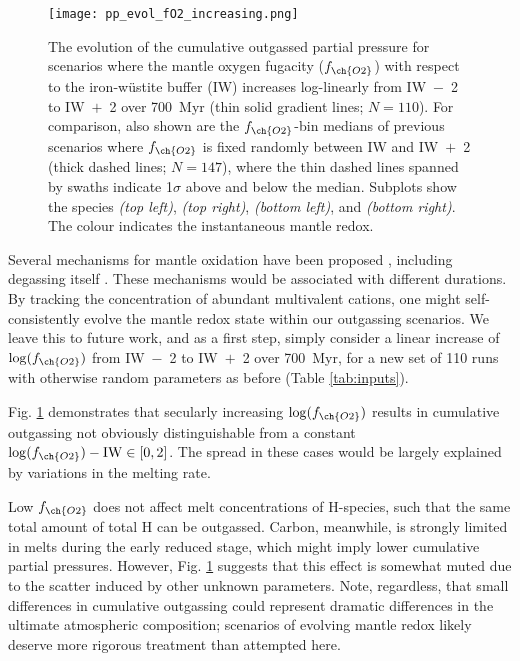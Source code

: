 \begin{figure}
\centering\texttt{[image: pp\_evol\_fO2\_increasing.png]}
\caption[The evolution of cumulative outgassed partial pressures for scenarios where Archean Earth's mantle oxygen fugacity increases steadily over time.]{The evolution of the cumulative outgassed partial pressure for scenarios where the mantle oxygen fugacity ($f_{\ch{O2}}$) with respect to the iron-w\"ustite buffer (IW) increases log-linearly from IW~$-$~2 to IW~$+$~2 over 700~Myr (thin solid gradient lines; $N=110$). For comparison, also shown are the $f_{\ch{O2}}$-bin medians of previous scenarios where $f_{\ch{O2}}$ is fixed randomly between IW and IW~$+$~2 (thick dashed lines; $N=147$), where the thin dashed lines spanned by swaths indicate 1$\sigma$ above and below the median. Subplots show the species  \textit{(top left)},  \textit{(top right)},  \textit{(bottom left)}, and  \textit{(bottom right)}. The colour indicates the instantaneous mantle redox. \label{fig:evol_fo2increase}}
\end{figure}


Several mechanisms for mantle oxidation have been proposed \citep[e.g.,][]{Wood2006, sharp_hydrogenbased_2013, gaillard_theoretical_2014, wordsworth_redox_2018,  Schaefer2018, NICKLAS2019}, including degassing itself \citep{kasting_mantle_1993}. These mechanisms would be associated with different durations. By tracking the concentration of abundant multivalent cations, one might self-consistently evolve the mantle redox state within our outgassing scenarios. We leave this to future work, and as a first step, simply consider a linear increase of $\log (f_{\ch{O2}})$ from IW~$-$~2 to IW~$+$~2 over 700~Myr, for a new set of 110 runs with otherwise random parameters as before (Table \ref{tab:inputs}). 

Fig. \ref{fig:evol_fo2increase} demonstrates that secularly increasing $\log (f_{\ch{O2}})$ results in cumulative outgassing not obviously distinguishable from a constant $\log (f_{\ch{O2}}) - {\rm IW} \in [0, 2]$. The spread in these cases would be largely explained by variations in the melting rate.

Low $f_{\ch{O2}}$ does not affect melt concentrations of H-species, such that the same total amount of total H can be outgassed. Carbon, meanwhile, is strongly limited in melts during the early reduced stage, which might imply lower cumulative partial pressures. However, Fig. \ref{fig:evol_fo2increase} suggests that this effect is somewhat muted due to the scatter induced by other unknown parameters. Note, regardless, that small differences in cumulative outgassing could represent dramatic differences in the ultimate atmospheric composition; scenarios of evolving mantle redox likely deserve more rigorous treatment than attempted here.



